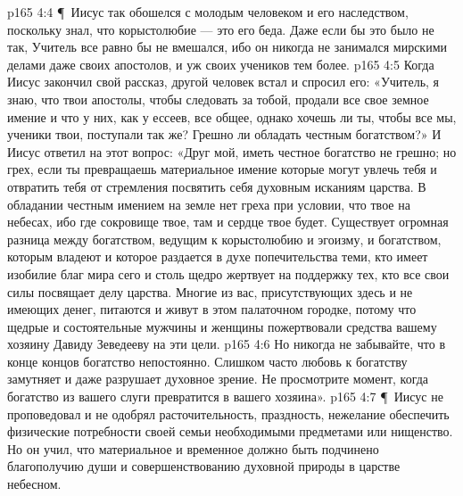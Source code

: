 \vs p165 4:4 \P\ Иисус так обошелся с молодым человеком и его наследством, поскольку знал, что корыстолюбие --- это его беда. Даже если бы это было не так, Учитель все равно бы не вмешался, ибо он никогда не занимался мирскими делами даже своих апостолов, и уж своих учеников тем более.
\vs p165 4:5 Когда Иисус закончил свой рассказ, другой человек встал и спросил его: «Учитель, я знаю, что твои апостолы, чтобы следовать за тобой, продали все свое земное имение и что у них, как у ессеев, все общее, однако хочешь ли ты, чтобы все мы, ученики твои, поступали так же? Грешно ли обладать честным богатством?» И Иисус ответил на этот вопрос: «Друг мой, иметь честное богатство не грешно; но грех, если ты превращаешь материальное имение  которые могут увлечь тебя и отвратить тебя от стремления посвятить себя духовным исканиям царства. В обладании честным имением на земле нет греха при условии, что  твое на небесах, ибо где сокровище твое, там и сердце твое будет. Существует огромная разница между богатством, ведущим к корыстолюбию и эгоизму, и богатством, которым владеют и которое раздается в духе попечительства теми, кто имеет изобилие благ мира сего и столь щедро жертвует на поддержку тех, кто все свои силы посвящает делу царства. Многие из вас, присутствующих здесь и не имеющих денег, питаются и живут в этом палаточном городке, потому что щедрые и состоятельные мужчины и женщины пожертвовали средства вашему хозяину Давиду Зеведееву на эти цели.
\vs p165 4:6 Но никогда не забывайте, что в конце концов богатство непостоянно. Слишком часто любовь к богатству замутняет и даже разрушает духовное зрение. Не просмотрите момент, когда богатство из вашего слуги превратится в вашего хозяина».
\vs p165 4:7 \P\ Иисус не проповедовал и не одобрял расточительность, праздность, нежелание обеспечить физические потребности своей семьи необходимыми предметами или нищенство. Но он учил, что материальное и временное должно быть подчинено благополучию души и совершенствованию духовной природы в царстве небесном.
